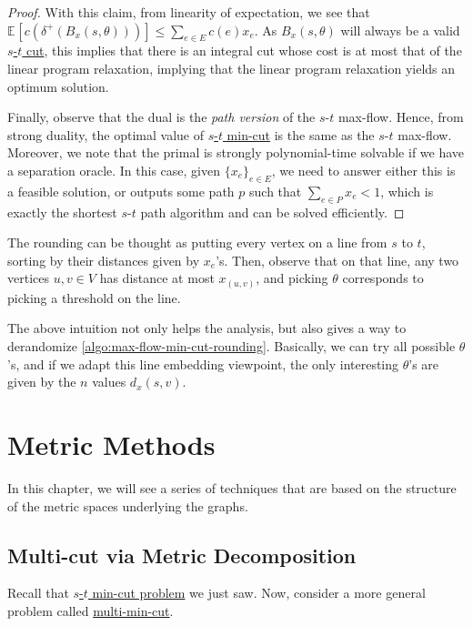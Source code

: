 \begin{proof}
	With this claim, from linearity of expectation, we see that \(\mathbb{E}_{}[c(\delta ^+(B_x(s, \theta )))] \leq \sum_{e \in E} c(e) x_e\). As \(B_x(s, \theta )\) will always be a valid \hyperref[prb:s-t-min-cut]{\(s\)-\(t\) cut}, this implies that there is an integral cut whose cost is at most that of the linear program relaxation, implying that the linear program relaxation yields an optimum solution.

	Finally, observe that the dual is the \emph{path version} of the \(s\)-\(t\) max-flow. Hence, from strong duality, the optimal value of \hyperref[prb:s-t-min-cut]{\(s\)-\(t\) min-cut} is the same as the \(s\)-\(t\) max-flow. Moreover, we note that the primal is strongly polynomial-time solvable if we have a separation oracle. In this case, given \(\{ x_e \} _{e\in E}\), we need to answer either this is a feasible solution, or outputs some path \(p\) such that \(\sum_{e \in P} x_e < 1\), which is exactly the shortest \(s\)-\(t\) path algorithm and can be solved efficiently.
\end{proof}

\begin{intuition}
	The rounding can be thought as putting every vertex on a line from \(s\) to \(t\), sorting by their distances given by \(x_e\)'s. Then, observe that on that line, any two vertices \(u, v \in V\) has distance at most \(x_{(u, v)}\), and picking \(\theta \) corresponds to picking a threshold on the line.
\end{intuition}

The above intuition not only helps the analysis, but also gives a way to derandomize \autoref{algo:max-flow-min-cut-rounding}. Basically, we can try all possible \(\theta \)'s, and if we adapt this line embedding viewpoint, the only interesting \(\theta \)'s are given by the \(n\) values \(d_x(s, v)\).

\chapter{Metric Methods}
In this chapter, we will see a series of techniques that are based on the structure of the metric spaces underlying the graphs.

\section{Multi-cut via Metric Decomposition}
Recall that \hyperref[prb:s-t-min-cut]{\(s\)-\(t\) min-cut problem} we just saw. Now, consider a more general problem called \hyperref[prb:multi-min-cut]{multi-min-cut}.

